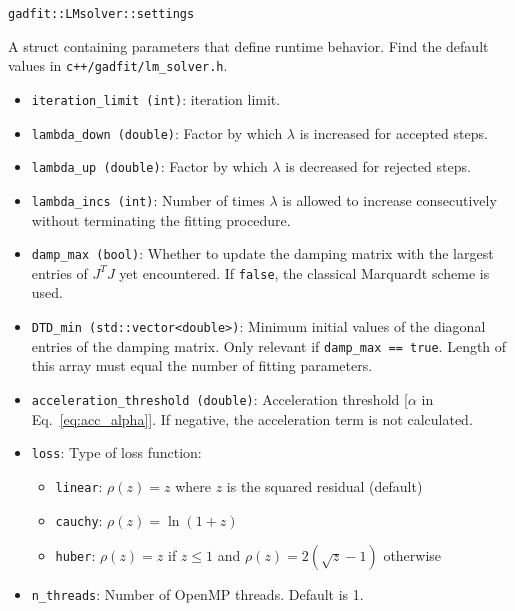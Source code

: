 \documentclass{article}
\begin{document}
\begin{verbatim}
gadfit::LMsolver::settings
\end{verbatim}
A struct containing parameters that define runtime behavior. Find the default values in \texttt{c++/gadfit/lm\_solver.h}.
\begin{itemize}
\item \verb+iteration_limit (int)+: iteration limit.
\item \verb+lambda_down (double)+: Factor by which $\lambda$ is increased for accepted steps.
\item \verb+lambda_up (double)+: Factor by which $\lambda$ is decreased for rejected steps.
\item \verb+lambda_incs (int)+: Number of times $\lambda$ is allowed to increase consecutively without terminating the fitting procedure.
\item \verb+damp_max (bool)+: Whether to update the damping matrix with the largest entries of $J^TJ$ yet encountered. If \texttt{false}, the classical Marquardt scheme is used.
\item \verb+DTD_min (std::vector<double>)+: Minimum initial values of the diagonal entries of the damping matrix. Only relevant if \verb+damp_max == true+. Length of this array must equal the number of fitting parameters.
\item \verb+acceleration_threshold (double)+: Acceleration threshold [$\alpha$ in Eq.~\eqref{eq:acc_alpha}]. If negative, the acceleration term is not calculated.
\item \verb+loss+: Type of loss function:
  \begin{itemize}
  \item \verb+linear+: $\rho(z) = z$ where $z$ is the squared residual (default)
  \item \verb+cauchy+: $\rho(z) = \ln(1 + z)$
  \item \verb+huber+: $\rho(z) = z$ if $z \le 1$ and $\rho(z) = 2(\sqrt z - 1)$ otherwise
  \end{itemize}
\item \verb+n_threads+: Number of OpenMP threads. Default is 1.
\end{itemize}
\end{document}
